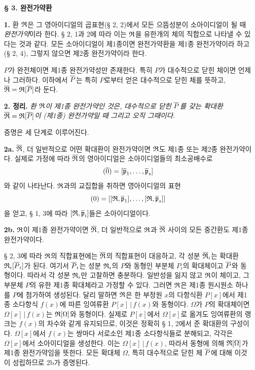 \begin{center}
\textbf{§ 3. 완전가약환}
\end{center}

\textbf{1.} 환 \(\mathfrak{R}\)은 그 영아이디얼의 곱표현(§ 2, 2)에서 모든 으뜸성분이 소아이디얼이 될 때 \emph{완전가약}이라 한다. § 2, 1과 2에 따라 이는 \(\mathfrak{R}\)을 유한개의 체의 직합으로 나타낼 수 있다는 것과 같다. 모든 소아이디얼이 제1종이면 완전가약환을 제1종 완전가약이라 하고(§ 2, 4), 그렇지 않으면 제2종 완전가약이라 한다.

\(P\)가 완전체이면 제1종 완전가약성만 존재한다. 특히 \(P\)가 대수적으로 닫힌 체이면 언제나 그러하다. 이하에서 \(\overline P\)는 특히 \(P\)로부터 얻은 대수적으로 닫힌 체를 뜻하고, \(\overline{\mathfrak R}=\mathfrak{R}[\overline P]\)라 둔다.

\textbf{2. 정리.} \emph{환 \(\mathfrak{R}\)이 제1종 완전가약인 것은, 대수적으로 닫힌 \(\overline P\)를 갖는 확대환 \(\overline{\mathfrak R}=\mathfrak{R}[\overline P]\)이 (제1종) 완전가약일 때 그리고 오직 그때이다.}

증명은 세 단계로 이루어진다.

\textbf{2a.} \(\overline{\mathfrak R}\), 더 일반적으로 어떤 확대환이 완전가약이면 \(\mathfrak{R}\)도 제1종 또는 제2종 완전가약이다. 실제로 가정에 따라 \(\overline{\mathfrak R}\)의 영아이디얼은 소아이디얼들의 최소공배수로
\[
        (\overline{0})=[\overline{\mathfrak p}_1,\ldots,\overline{\mathfrak p}_s]
\]
와 같이 나타난다. \(\mathfrak{R}\)과의 교집합을 취하면 영아이디얼의 표현
\[
        (0)=[[\mathfrak{R},\overline{\mathfrak p}_1],\ldots,[\mathfrak{R},\overline{\mathfrak p}_s]]
\]
을 얻고, § 1, 3에 따라 \([\mathfrak{R},\overline{\mathfrak p}_i]\)들은 소아이디얼이다.

\textbf{2b.} \(\mathfrak{R}\)이 제1종 완전가약이면 \(\overline{\mathfrak R}\), 더 일반적으로 \(\mathfrak{R}\)과 \(\overline{\mathfrak R}\) 사이의 모든 중간환도 제1종 완전가약이다.

§ 2, 3에 따라 \(\mathfrak{R}\)의 직합표현에는 \(\overline{\mathfrak R}\)의 직합표현이 대응하고, 각 성분 \(\overline{\mathfrak R}_i\)는 확대환 \(\mathfrak{R}_i[\overline P_i]\)가 된다. 여기서 \(\overline P_i\)는 성분 \(\mathfrak{R}_i\)의 \(P\)와 동형인 부분체 \(P_i\)의 확대체이고 \(\overline P\)와 동형이다. 따라서 각 성분 \(\mathfrak{R}_i\)만 고찰하면 충분하다. 일반성을 잃지 않고 \(\mathfrak{R}\)이 체이고, 그 부분체 \(P\)의 유한 제1종 확대체라고 가정할 수 있다. 그러면 \(\mathfrak{R}\)은 제1종 원시원소 하나를 \(P\)에 첨가하여 생성된다. 달리 말하면 \(\mathfrak{R}\)은 한 부정원 \(x\)의 다항식환 \(P[x]\)에서 제1종 소다항식 \(f(x)\)에 따른 잉여류환 \(P[x]\,|\,f(x)\)와 동형이다. \(\Omega\)가 \(P\)의 확대체이면 \(\Omega[x]\,|\,f(x)\)는 \(\mathfrak{R}[\Omega]\)와 동형이다. 실제로 \(P[x]\)에서 \(\Omega[x]\)로 옮겨도 잉여류환의 랭크는 \(f(x)\)의 차수와 같게 유지되므로, 이것은 정확히 § 1, 2에서 준 확대환의 구성이다. \(\Omega[x]\)에서 \(f(x)\)는 쌍마다 서로소인 제1종 소다항식들로 분해되고, 각각은 \(\Omega[x]\)에서 소아이디얼을 생성한다. 이는 \(\Omega[x]\,|\,f(x)\), 따라서 동형에 의해 \(\mathfrak{R}[\Omega]\)가 제1종 완전가약임을 뜻한다. 모든 확대체 \(\Omega\), 특히 대수적으로 닫힌 체 \(\overline P\)에 대해 이것이 성립하므로 2b가 증명된다.

